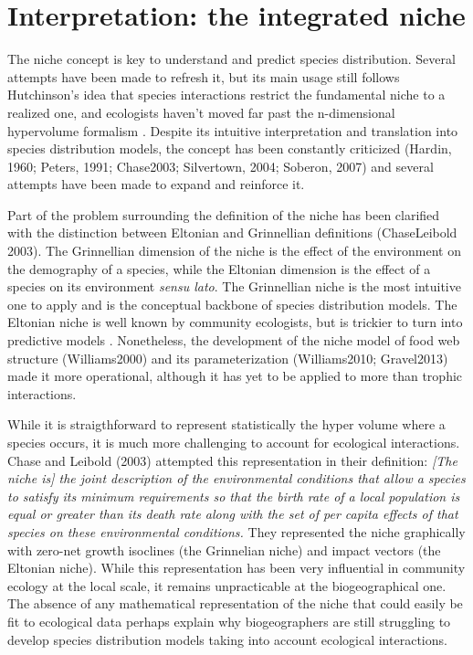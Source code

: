 \documentclass[12pt]{article}
\begin{document}
\newpage
\section*{Interpretation: the integrated niche}

The niche concept is key to understand and predict species
distribution. Several attempts have been made to refresh it, but its main
usage still follows Hutchinson’s idea that species interactions restrict
the fundamental niche to a realized one, and ecologists haven't moved far past
the n-dimensional hypervolume formalism \parencite{Blonder2014}. Despite its
intuitive interpretation and translation into species distribution models,
the concept has been constantly criticized (Hardin, 1960; Peters, 1991;
Chase2003; Silvertown, 2004; Soberon, 2007) and several attempts have been
made to expand and reinforce it.

Part of the problem surrounding the definition of the niche has been
clarified with the distinction between Eltonian and Grinnellian definitions
(ChaseLeibold 2003). The Grinnellian dimension of the niche is the effect of
the environment on the demography of a species, while the Eltonian dimension
is the effect of a species on its environment \emph{sensu lato}.  %
The Grinnellian niche is the most intuitive one to apply and is the conceptual
backbone of species distribution models. The Eltonian niche is well known
by community ecologists, but is trickier to turn into predictive models
\parencite{Devictor2010a}. Nonetheless, the development of the niche model
of food web structure (Williams2000) and its parameterization (Williams2010;
Gravel2013) made it more operational, although it has yet to be applied to
more than trophic interactions. 

While it is straigthforward to represent statistically the hyper volume where a species
occurs, it is much more challenging to account for ecological interactions.
Chase and Leibold (2003) attempted this representation in their definition:
\textit{[The niche is] the joint description of the environmental conditions
that allow a species to satisfy its minimum requirements so that the birth rate
of a local population is equal or greater than its death rate along with the set
of per capita effects of that species on these environmental conditions.} They
represented the niche graphically with zero-net growth isoclines (the Grinnelian
niche) and impact vectors (the Eltonian niche). While this representation has
been very influential in community ecology at the local scale, it remains
unpracticable at the biogeographical one.
The absence of any mathematical
representation of the niche that could easily be fit to ecological data perhaps
explain why biogeographers are still struggling to develop species distribution
models taking into account ecological interactions.
\end{document}
